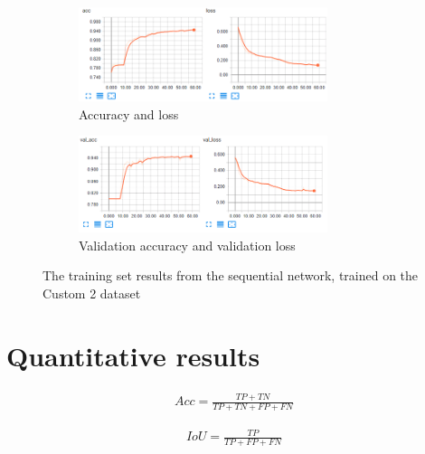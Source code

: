 \documentclass[USenglish]{ifimaster}  %
\begin{document}
\begin{figure}[ht]
\centering
\begin{subfigure}[b]{\textwidth}
\centering
\includegraphics[width=0.8\textwidth]{bilder/custom_2_training/Custom_2_sequential_training_acc_results.png}
\caption{Accuracy and loss}
\label{fig:custom_2_sequential_acc_result}
\end{subfigure}
\hfill
\begin{subfigure}[b]{\textwidth}
\centering
\includegraphics[width=0.8\textwidth]{bilder/custom_2_training/Custom_2_sequential_training_val_acc_results.png}
\caption{Validation accuracy and validation loss}
\label{fig:custom_2_sequential_val_acc_result}
\end{subfigure}
\caption{The training set results from the sequential network, trained on the Custom 2 dataset}
\label{fig:custom_2_sequential_result}
\end{figure}

\clearpage

\section{Quantitative results}

\begin{equation}\label{eq:accuracy}
\begin{aligned}
Acc = \frac{TP + TN}{TP + TN + FP + FN}
\end{aligned}
\end{equation}

\begin{equation}\label{eq:iou}
\begin{aligned}
IoU = \frac{TP}{TP + FP + FN}
\end{aligned}
\end{equation}
\end{document}
